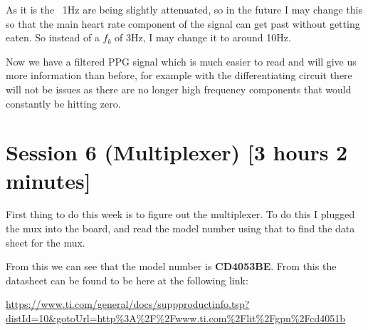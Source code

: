 \documentclass{article}
\begin{document}
As it is the ~1Hz are being slightly attenuated, so in the future I may change this so that the main heart rate component of the signal can get past without getting eaten. So instead of a $f_b$ of 3Hz, I may change it to around 10Hz.
\begin{center}
\end{center}
Now we have a filtered PPG signal which is much easier to read and will give us more information than before, for example with the differentiating circuit there will not be issues as there are no longer high frequency components that would constantly be hitting zero.
\newpage
\section{Session 6 (Multiplexer) [3 hours 2 minutes]}
First thing to do this week is to figure out the multiplexer. To do this I plugged the mux into the board, and read the model number using that to find the data sheet for the mux.
\begin{center}
\end{center}
From this we can see that the model number is \textbf{CD4053BE}. From this the datasheet can be found to be here at the following link:

\url{https://www.ti.com/general/docs/suppproductinfo.tsp?distId=10&gotoUrl=http%3A%2F%2Fwww.ti.com%2Flit%2Fgpn%2Fcd4051b}
\end{document}
